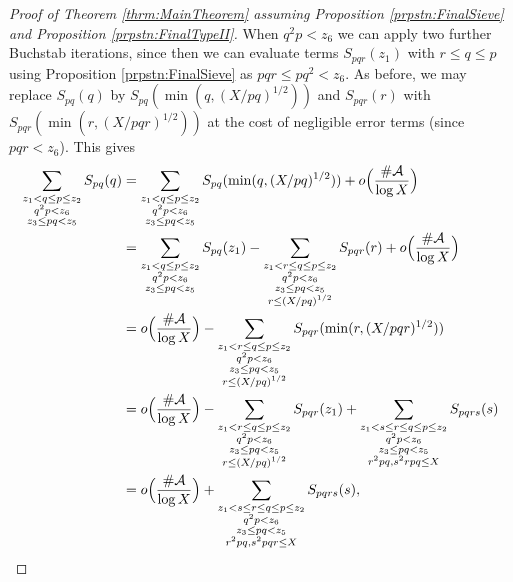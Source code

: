 \documentclass[10pt]{amsart}
\theoremstyle{plain}
\numberwithin{sblmm}{thrm}
\numberwithin{equation}{section}
\begin{document}
\begin{proof}[Proof of Theorem \ref{thrm:MainTheorem} assuming Proposition \ref{prpstn:FinalSieve} and Proposition \ref{prpstn:FinalTypeII}]
When $q^2p<z_6$ we can apply two further Buchstab iterations, since then we can evaluate terms $S_{p q r}(z_1)$ with $r\le q\le p$ using Proposition \ref{prpstn:FinalSieve} as $p q r\le p q^2<z_6$. As before, we may replace $S_{p q}(q)$ by $S_{p q}(\min(q,(X/p q)^{1/2}))$ and $S_{p q r}(r)$ with $S_{p q r}(\min(r,(X/p q r)^{1/2}))$ at the cost of negligible error terms (since $p q r<z_6$). This gives
%
\begingroup
\allowdisplaybreaks
\begin{align*}
\sum_{\substack{z_1<q\le p\le z_2\\ q^2 p < z_6\\ z_3\le p q<z_5}}S_{p q}(q)&=\sum_{\substack{z_1<q\le p\le z_2\\ q^2 p < z_6\\ z_3\le p q<z_5}}S_{p q}(\min(q,(X/p q)^{1/2}))+o\Bigl(\frac{\#\mathcal{A}}{\log{X}}\Bigr)\\
&=\sum_{\substack{ z_1<q\le p\le z_2\\ q^2 p < z_6\\ z_3\le p q<z_5}}S_{p q}(z_1)
-\sum_{\substack{z_1<r\le q\le p\le z_2\\ q^2 p < z_6\\ z_3\le p q<z_5\\ r\le (X/p q)^{1/2} }}S_{p q r}(r)+o\Bigl(\frac{\#\mathcal{A}{}}{\log{X}}\Bigr)\\
&=%
o\Bigl(\frac{\#\mathcal{A}{}}{\log{X}}\Bigr)
-\sum_{\substack{z_1<r\le q\le p\le z_2\\ q^2 p < z_6\\ z_3\le p q<z_5\\ r\le (X/p q)^{1/2} }}S_{p q r}(\min(r,(X/p q r)^{1/2}))\\
&=o\Bigl(\frac{\#\mathcal{A}{}}{\log{X}}\Bigr)-\sum_{\substack{z_1<r\le q\le p\le z_2\\ q^2 p < z_6\\ z_3\le p q<z_5 \\ r\le (X/ p q)^{1/2}}}S_{p q r}(z_1)
+\sum_{\substack{z_1<s\le r\le q\le p\le z_2\\ q^2 p < z_6\\ z_3\le p q<z_5 \\ r^2 p q, s^2 r p q\le X }}S_{p q r s}(s)\\
&=o\Bigl(\frac{\#\mathcal{A}{}}{\log{X}}\Bigr)
+\sum_{\substack{z_1<s\le r\le q\le p\le z_2\\ q^2 p < z_6\\ z_3\le p q<z_5\\ r^2p q, s^2p q r\le X }}S_{p q r s}(s),
\end{align*}

\end{proof}
\end{document}

